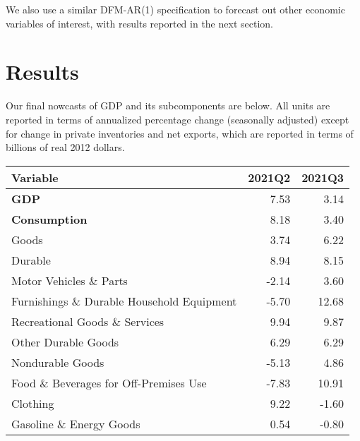 \documentclass[11pt, letterpaper]{article}\usepackage[]{graphicx}\usepackage[]{color}
\begin{document}
We also use a similar DFM-AR(1) specification to forecast out other economic variables of interest, with results reported in the next section.


\section{Results}
Our final nowcasts of GDP and its subcomponents are below. All units are reported in terms of annualized percentage change (seasonally adjusted) except for change in private inventories and net exports, which are reported in terms of billions of real 2012 dollars.
\begin{table}[H]
\centering
\begingroup\fontsize{10pt}{12pt}\selectfont
\begin{tabular}{lrr}
  \hline
Variable & 2021Q2 & 2021Q3 \\ 
  \hline
\hspace{0mm} \textbf{GDP} & 7.53 & 3.14 \\ 
  \hspace{0mm} \textbf{Consumption} & 8.18 & 3.40 \\ 
  \hspace{8mm}  Goods & 3.74 & 6.22 \\ 
  \hspace{16mm}  Durable & 8.94 & 8.15 \\ 
  \hspace{24mm}  Motor Vehicles \& Parts & -2.14 & 3.60 \\ 
  \hspace{24mm}  Furnishings \& Durable Household Equipment & -5.70 & 12.68 \\ 
  \hspace{24mm}  Recreational Goods \& Services & 9.94 & 9.87 \\ 
  \hspace{24mm}  Other Durable Goods & 6.29 & 6.29 \\ 
  \hspace{16mm}  Nondurable Goods & -5.13 & 4.86 \\ 
  \hspace{24mm}  Food \& Beverages for Off-Premises Use & -7.83 & 10.91 \\ 
  \hspace{24mm}  Clothing & 9.22 & -1.60 \\ 
  \hspace{24mm}  Gasoline \& Energy Goods & 0.54 & -0.80 \\ 

\end{tabular}
\end{table}
\end{document}
